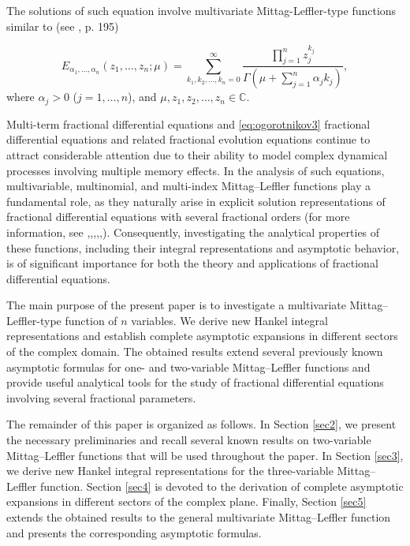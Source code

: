 \documentclass[12pt, reqno]{amsart}
\theoremstyle{definition}
\theoremstyle{remark}
\numberwithin{equation}{section}
\begin{document}
The solutions of such equation involve multivariate Mittag-Leffler-type functions similar to (see \cite{Gorenflo}, p. 195) 

\begin{equation}\label{multi variable ML}
E_{\alpha_1,\dots,\alpha_n}(z_1,\dots,z_n;\mu)
=
\sum_{k_1,k_2,\dots,k_n=0}^{\infty}
\frac{\prod_{j=1}^{n}z_j^{k_j}}
{\Gamma\!\left(\mu+\sum_{j=1}^{n}\alpha_jk_j\right)},
\end{equation}
where $\alpha_j>0$ (\(j=1,\ldots,n\)), and \(\mu, z_1,z_2,\dots,z_n\in\mathbb{C}\).


 Multi-term fractional differential equations and \eqref{eq:ogorotnikov3} fractional differential equations and related fractional evolution equations continue to attract considerable attention due to their ability to model complex dynamical processes involving multiple memory effects. In the analysis of such equations, multivariable, multinomial, and multi-index Mittag--Leffler functions play a fundamental role, as they naturally arise in explicit solution representations of fractional differential equations with several fractional orders (for more information, see \cite{Ashurov},\cite{Kiryakova},\cite{Yamamoto},\cite{Luchko},\cite{Ogorodnikov2},\cite{Umarov}). Consequently, investigating the analytical properties of these functions, including their integral representations and asymptotic behavior, is of significant importance for both the theory and applications of  fractional differential equations.




The main purpose of the present paper is to investigate a multivariate Mittag--Leffler-type function of $n$ variables. We derive new Hankel integral representations and establish complete asymptotic expansions in different sectors of the complex domain. The obtained results extend several previously known asymptotic formulas for one- and two-variable Mittag--Leffler functions and provide useful analytical tools for the study of fractional differential equations involving several fractional parameters.

The remainder of this paper is organized as follows. In Section \ref{sec2}, we present the necessary preliminaries and recall several known results on two-variable Mittag--Leffler functions that will be used throughout the paper. In Section \ref{sec3}, we derive new Hankel integral representations for the three-variable Mittag--Leffler function. Section \ref{sec4} is devoted to the derivation of complete asymptotic expansions in different sectors of the complex plane. Finally, Section \ref{sec5} extends the obtained results to the general multivariate Mittag--Leffler function and presents the corresponding asymptotic formulas.
\end{document}
